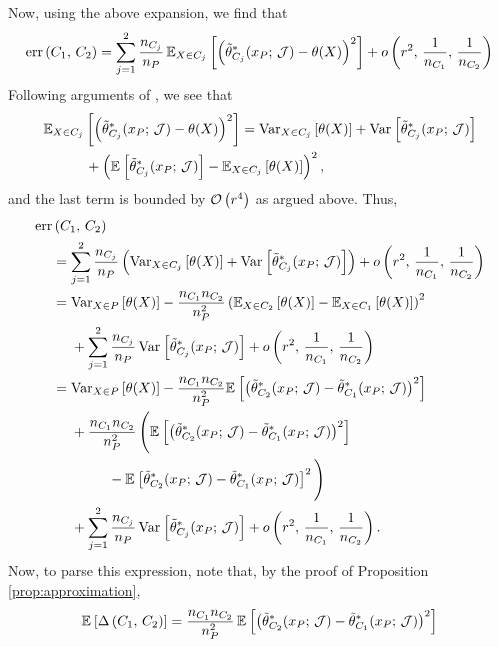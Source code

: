\documentclass[aos]{imsart}
\theoremstyle{plain}
\theoremstyle{definition}
\theoremstyle{remark}
\begin{document}
\begin{CJK}{UTF8}{gbsn}
\begin{appendix}
Now, using the above expansion, we find that
\begin{equation*}
\err\p{C_1, \, C_2}  = \sum_{j = 1}^2 \frac{n_{C_j}}{n_P}  \, \EE[X \in C_j]{\p{\ttheta_{C_j}^*(x_P;\,\mathcal{J}) - \theta(X)}^2} +o\p{r^2, \, \frac{1}{n_{C_1}}, \, \frac{1}{n_{C_2}}} 
\end{equation*}
Following arguments of \citet{athey2016recursive}, we see that
\begin{equation*}
\begin{split}
&\EE[X \in C_j]{\p{\ttheta_{C_j}^*(x_P;\,\mathcal{J}) - \theta(X)}^2} = \Var[X \in C_j]{\theta(X)} + \Var{\ttheta_{C_j}^*(x_P;\,\mathcal{J})} \\
&\ \ \ \ \ \ \ \ \ + \p{\EE{\ttheta_{C_j}^*(x_P;\,\mathcal{J})} - \EE[X \in C_j]{\theta(X)}}^2,
\end{split}
\end{equation*}
and the last term is bounded by $\mathcal{O}\left(r^4\right)$ as argued above. Thus,
\begin{align*}
\err&\p{C_1, \, C_2} \\
&= \sum_{j = 1}^2 \frac{n_{C_j}}{n_P} \p{ \Var[X \in C_j]{\theta(X)} + \Var{\ttheta_{C_j}^*(x_P;\,\mathcal{J})} } + o\p{r^2, \, \frac{1}{n_{C_1}}, \, \frac{1}{n_{C_2}}} \\
&= \Var[X \in P]{\theta(X)} - \frac{n_{C_1}n_{C_2}}{n_P^2} \p{\EE[X \in C_2]{\theta(X)} - \EE[X \in C_1]{\theta(X)}}^2  \\
& \ \ \ \  + \sum_{j = 1}^2 \frac{n_{C_j}}{n_P}  \Var{\ttheta_{C_j}^*(x_P;\,\mathcal{J})} + o\p{r^2, \, \frac{1}{n_{C_1}}, \, \frac{1}{n_{C_2}}} \\
&= \Var[X \in P]{\theta(X)} - \frac{n_{C_1}n_{C_2}}{n_P^2}\EE{\p{\ttheta_{C_2}^*(x_P;\,\mathcal{J}) - \ttheta_{C_1}^*(x_P;\,\mathcal{J})}^2} \\
&\ \ \ \ + \frac{n_{C_1}n_{C_2}}{n_P^2} \,\Bigg(\EE{\p{\ttheta_{C_2}^*(x_P;\,\mathcal{J}) - \ttheta_{C_1}^*(x_P;\,\mathcal{J})}^2} \\
&\ \ \ \ \ \ \ \ \ \ \ \ - \EE{\ttheta_{C_2}^*(x_P;\,\mathcal{J}) - \ttheta_{C_1}^*(x_P;\,\mathcal{J})}^2\Bigg) \\
& \ \ \ \ + \sum_{j = 1}^2 \frac{n_{C_j}}{n_P}  \Var{\ttheta_{C_j}^*(x_P;\,\mathcal{J})} + o\p{r^2, \, \frac{1}{n_{C_1}}, \, \frac{1}{n_{C_2}}}.
\end{align*}
Now, to parse this expression, note that, by the proof of Proposition \ref{prop:approximation},
\begin{align*}
&\EE{\Delta\p{C_1, \, C_2}} = \frac{n_{C_1}n_{C_2}}{n_P^2} \, \EE{\p{\ttheta_{C_2}^*(x_P;\,\mathcal{J}) - \ttheta_{C_1}^*(x_P;\,\mathcal{J})}^2} \\

\end{align*}
\end{appendix}
\end{CJK}
\end{document}
